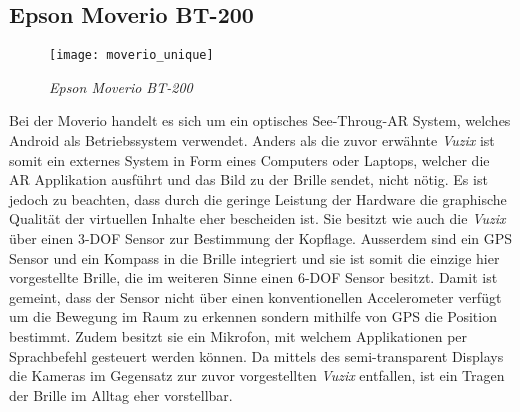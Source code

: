 \subsection*{Epson Moverio BT-200}
\begin{wrapfigure}{l}{0.5\textwidth}
	\vspace{-20pt}
	\begin{center}
		\texttt{[image: moverio\_unique]}
	\end{center}
	\vspace{-15pt}
	\caption{\textit{Epson Moverio BT-200}}\label{moveriogrpahic}
	\vspace{-12pt}
\end{wrapfigure}
Bei der Moverio handelt es sich um ein optisches See-Throug-AR System, welches Android als Betriebssystem verwendet. Anders als die zuvor erwähnte \textit{Vuzix} ist somit ein externes System in Form eines Computers oder Laptops, welcher die AR Applikation ausführt und das Bild zu der Brille sendet, nicht nötig. Es ist jedoch zu beachten, dass durch die geringe Leistung der Hardware die graphische Qualität der virtuellen Inhalte eher bescheiden ist.  Sie besitzt wie auch die \textit{Vuzix} über einen 3-DOF Sensor zur Bestimmung der Kopflage. Ausserdem sind ein GPS Sensor und ein Kompass in die Brille integriert und sie ist somit die einzige hier vorgestellte Brille, die im weiteren Sinne einen 6-DOF Sensor besitzt. Damit ist gemeint, dass der Sensor nicht über einen konventionellen Accelerometer verfügt um die Bewegung im Raum zu erkennen sondern mithilfe von GPS die Position bestimmt. Zudem besitzt sie  ein Mikrofon, mit welchem Applikationen per Sprachbefehl gesteuert werden können. Da mittels des semi-transparent Displays die Kameras im Gegensatz zur zuvor vorgestellten \textit{Vuzix} entfallen, ist ein Tragen der Brille im Alltag eher vorstellbar.\cite{website:epson}
\newpage
